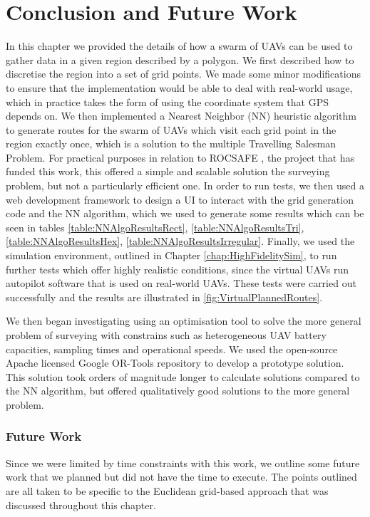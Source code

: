 \section{Conclusion and Future Work}\label{sec:SurveyingConclusionFutureWork}
In this chapter we provided the details of how a swarm of UAVs can be used to gather data in a given region described by a polygon. We first described how to discretise the region into a set of grid points. We made some minor modifications to ensure that the implementation would be able to deal with real-world usage, which in practice takes the form of using the coordinate system that GPS depends on. We then implemented a Nearest Neighbor (NN) heuristic algorithm to generate routes for the swarm of UAVs which visit each grid point in the region exactly once, which is a solution to the multiple Travelling Salesman Problem. For practical purposes in relation to ROCSAFE \cite{rocsafeNUIG}, the project that has funded this work, this offered a simple and scalable solution the surveying problem, but not a particularly efficient one. In order to run tests, we then used a web development framework to design a UI to interact with the grid generation code and the NN algorithm, which we used to generate some results which can be seen in tables \ref{table:NNAlgoResultsRect}, \ref{table:NNAlgoResultsTri}, \ref{table:NNAlgoResultsHex}, \ref{table:NNAlgoResultsIrregular}. Finally, we used the simulation environment, outlined in Chapter \ref{chap:HighFidelitySim}, to run further tests which offer highly realistic conditions, since the virtual UAVs run autopilot software that is used on real-world UAVs. These tests were carried out successfully and the results are illustrated in \ref{fig:VirtualPlannedRoutes}. 

We then began investigating using an optimisation tool to solve the more general problem of surveying with constrains such as heterogeneous UAV battery capacities, sampling times and operational speeds. We used the open-source Apache licensed Google OR-Tools repository to develop a prototype solution. This solution took orders of magnitude longer to calculate solutions compared to the NN algorithm, but offered qualitatively good solutions to the more general problem.



\subsubsection{Future Work}
Since we were limited by time constraints with this work, we outline some future work that we planned but did not have the time to execute. The points outlined are all taken to be specific to the Euclidean grid-based approach that was discussed throughout this chapter.

